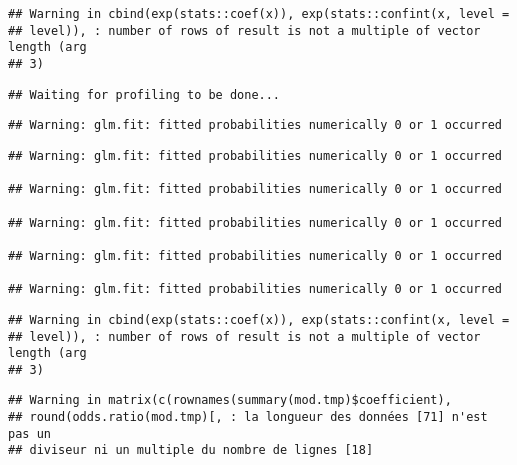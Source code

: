 \documentclass[]{article}
\newenvironment{Shaded}{\begin{snugshade}}{\end{snugshade}}
\newcommand{\KeywordTok}[1]{\textcolor[rgb]{0.13,0.29,0.53}{\textbf{#1}}}
\newcommand{\DataTypeTok}[1]{\textcolor[rgb]{0.13,0.29,0.53}{#1}}
\newcommand{\StringTok}[1]{\textcolor[rgb]{0.31,0.60,0.02}{#1}}
\newcommand{\OperatorTok}[1]{\textcolor[rgb]{0.81,0.36,0.00}{\textbf{#1}}}
\newcommand{\NormalTok}[1]{#1}
\begin{document}
\begin{verbatim}
## Warning in cbind(exp(stats::coef(x)), exp(stats::confint(x, level =
## level)), : number of rows of result is not a multiple of vector length (arg
## 3)
\end{verbatim}

\begin{verbatim}
## Waiting for profiling to be done...
\end{verbatim}

\begin{verbatim}
## Warning: glm.fit: fitted probabilities numerically 0 or 1 occurred
\end{verbatim}

\begin{verbatim}
## Warning: glm.fit: fitted probabilities numerically 0 or 1 occurred

## Warning: glm.fit: fitted probabilities numerically 0 or 1 occurred

## Warning: glm.fit: fitted probabilities numerically 0 or 1 occurred

## Warning: glm.fit: fitted probabilities numerically 0 or 1 occurred

## Warning: glm.fit: fitted probabilities numerically 0 or 1 occurred
\end{verbatim}

\begin{verbatim}
## Warning in cbind(exp(stats::coef(x)), exp(stats::confint(x, level =
## level)), : number of rows of result is not a multiple of vector length (arg
## 3)
\end{verbatim}

\begin{verbatim}
## Warning in matrix(c(rownames(summary(mod.tmp)$coefficient),
## round(odds.ratio(mod.tmp)[, : la longueur des données [71] n'est pas un
## diviseur ni un multiple du nombre de lignes [18]
\end{verbatim}

\begin{Shaded}
\end{Shaded}
\end{document}
